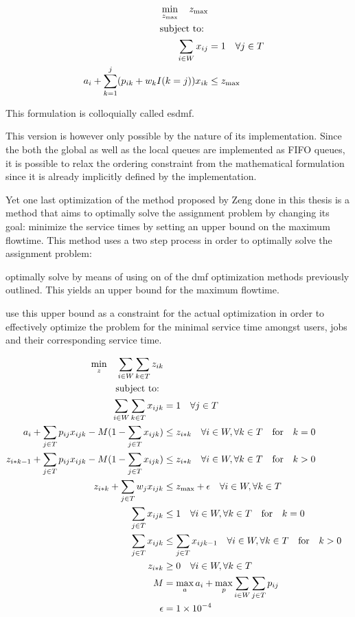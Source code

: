 \documentclass{seal_thesis}
\begin{document}
\begin{align}
    \min_{z_{\text{max}}} \quad z_{\text{max}}\\
    \text{subject to: } \notag \\
    \sum_{i \in W} x_{ij} &= 1 \quad \forall j \in T\\
    a_i + \sum_{k=1}^j (p_{ik} + w_k I(k=j))x_{ik} &\leq z_{\text{max}}
\end{align}

This formulation is colloquially called \gls{esdmf}.

This version is however only possible by the nature of its implementation. Since the both the global as well as the local queues are implemented as FIFO queues, it is possible to relax the ordering constraint from the mathematical formulation since it is already implicitly defined by the implementation.

Yet one last optimization of the method proposed by Zeng done in this thesis is a method that aims to optimally solve the assignment problem by changing its goal: minimize the service times by setting an upper bound on the maximum flowtime. This method uses a two step process in order to optimally solve the assignment problem:
\begin{enumerate*}
	\item optimally solve by means of using on of the \gls{dmf} optimization methods previously outlined. This yields an upper bound for the maximum flowtime.
	\item use this upper bound as a constraint for the actual optimization in order to effectively optimize the problem for the minimal service time amongst users, jobs and their corresponding service time.
\end{enumerate*}

\begin{align}
    \min_z \quad \sum_{i \in W} \sum_{k \in T} z_{ik}\\
    \text{subject to: } \notag \\
    \sum_{i \in W} \sum_{k \in T} x_{ijk} &= 1 \quad \forall j \in T\\
    a_i + \sum_{j \in T} p_{ij} x_{ijk} - M(1 - \sum_{j \in T} x_{ijk}) &\leq z_{i*k} \quad \forall i \in W, \forall k \in T \quad \text{for} \quad k=0\\
    z_{i*k-1} + \sum_{j \in T} p_{ij} x_{ijk} - M(1 - \sum_{j \in T} x_{ijk}) &\leq z_{i*k} \quad \forall i \in W, \forall k \in T \quad \text{for} \quad k>0\\
    z_{i*k}+ \sum_{j \in T} w_j x_{ijk} &\leq z_{\text{max}} + \epsilon \quad \forall i \in W, \forall k \in T\\
    \sum_{j \in T} x_{ijk} &\leq 1 \quad \forall i \in W, \forall k \in T \quad \text{for} \quad k=0\\
    \sum_{j \in T} x_{ijk} &\leq \sum_{j \in T} x_{ijk-1} \quad \forall i \in W, \forall k \in T \quad \text{for} \quad k>0\\
    z_{i*k} &\geq 0 \quad \forall i \in W, \forall k \in T\\
    M &= \max_a a_i + \max_p \sum_{i \in W} \sum_{j \in T} p_{ij}\\
    \epsilon &= \num{1e-4}
\end{align}
\end{document}
